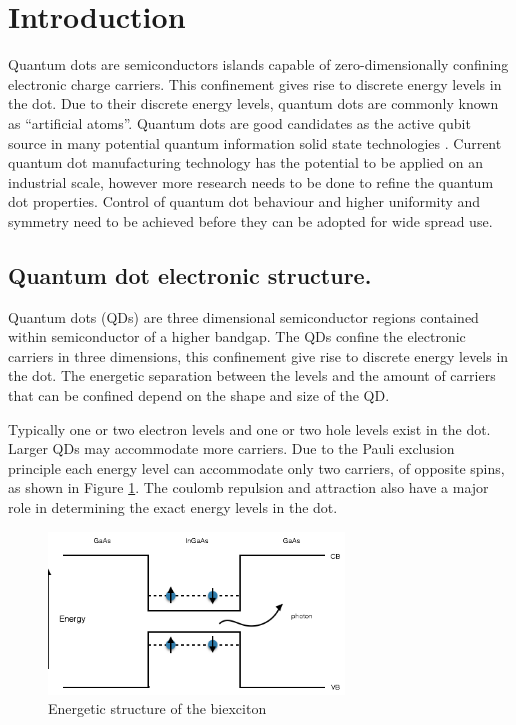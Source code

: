\documentclass[12pt, twoside]{article}
\numberwithin{equation}{section}
\begin{document}
\newpage

\newpage
\thispagestyle{empty} \mbox{}

\pagestyle{plain}

\newpage

\tableofcontents

\newpage

\pagestyle{fancy}

\newpage
\section{Introduction}

Quantum dots are semiconductors islands capable of zero-dimensionally
confining electronic charge carriers. This confinement gives rise to
discrete energy levels in the dot. Due to their discrete energy levels,
quantum dots are commonly known as ``artificial atoms''. Quantum dots
are good candidates as the active qubit source in many potential quantum
information solid state technologies \cite{first}. Current quantum dot
manufacturing technology has the potential to be applied on an
industrial scale, however more research needs to be done to refine the
quantum dot properties. Control of quantum dot behaviour and higher
uniformity and symmetry need to be achieved before they can be adopted
for wide spread use.

\subsection{Quantum dot electronic
structure.}\label{quantum-dot-electronic-structure.}

Quantum dots (QDs) are three dimensional semiconductor regions contained
within semiconductor of a higher bandgap. The QDs confine the electronic
carriers in three dimensions, this confinement give rise to discrete
energy levels in the dot. The energetic separation between the levels
and the amount of carriers that can be confined depend on the shape and
size of the QD.

Typically one or two electron levels and one or two hole levels exist in
the dot. Larger QDs may accommodate more carriers. Due to the Pauli
exclusion principle each energy level can accommodate only two carriers,
of opposite spins, as shown in Figure \ref{fig:biexciton}. The coulomb
repulsion and attraction also have a major role in determining the exact
energy levels in the dot.

\begin{figure}[h!]
    \centering
    \includegraphics[width=0.7\textwidth]{images/biexciton.png}
    \caption{Energetic structure of the biexciton}
    \label{fig:biexciton}
\end{figure}
\end{document}
